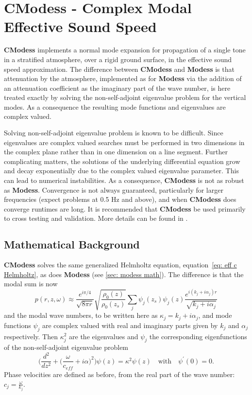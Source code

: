 \section{CModess - Complex Modal Effective Sound Speed}
\label{sec: CModess}

{\bf CModess} implements a normal mode expansion for propagation of a single tone in a stratified atmosphere, over a rigid ground surface, in the effective sound speed approximation. The difference between {\bf CModess} and {\bf Modess} is that attenuation by the atmosphere, implemented as for {\bf Modess} via the addition of an attenuation coefficient as the imaginary part of the wave number, is here treated exactly by solving the non-self-adjoint eigenvalue problem for the vertical modes. As a consequence the resulting mode functions and eigenvalues are complex valued. 

Solving non-self-adjoint eigenvalue problem is known to be difficult. Since eigenvalues are complex valued searches must be performed in two dimensions in the complex plane rather than in one dimension on a line segment. Further complicating matters, the solutions of the underlying differential equation grow and decay exponentially due to the complex valued eigenvalue parameter. This can lead to numerical instabilities. As a consequence, {\bf CModess} is not as robust as {\bf Modess}. Convergence is not always guaranteed, particularly for larger frequencies (expect problems at 0.5 Hz and above), and when {\bf CModess} does converge runtimes are long. It is recommended that {\bf CModess} be used primarily to cross testing and validation. More details can be found in \cite{assink_dissertation}.


\subsection{Mathematical Background}
\label{sec: cmodess math}

{\bf CModess} solves the same generalized Helmholtz equation, equation~\ref{eq: eff c Helmholtz}, as does {\bf Modess} (see \ref{sec: modess math}). The difference is that the modal sum is now 
\[
p(r,z,\omega)
\approx
\frac{e^{i \pi /4}}{\sqrt{8 \pi r}} \sqrt{\frac {\rho_0(z)} {\rho_0(z_s)}} \sum_j\psi_j(z_s)\psi_j(z) \frac{e^{i (k_j+i\alpha_j)r}}{\sqrt{k_j+i\alpha_j}}
\]
and the modal wave numbers, to be written here as $\kappa_j=k_j+i\alpha_j$, and mode functions $\psi_j$ are complex valued with real and imaginary parts given by $k_j$ and $\alpha_j$ respectively. Then $\kappa_j^2$ are the eigenvalues and $\psi_j$ the corresponding eigenfunctions of the non-self-adjoint eigenvalue problem 
\[
\Big( 
\frac{d^2}{dz^2} +\big(\frac{\omega}{c_{eff}}+i\alpha\big)^2
\Big)\psi(z) 
= 
\kappa^2\psi(z) 
\quad \text{with} \quad 
\psi^\prime(0)=0. 
\]
Phase velocities are defined as before, from the real part of the wave number: $c_j=\frac{\omega}{k_j}$. 

